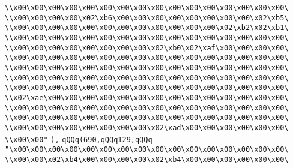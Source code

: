 \verb|\\x00\x00\x00\x00\x00\x00\x00\x00\x00\x00\x00\x00\x00\x00\x00\x00\|\newline
\verb|\\x00\x00\x00\x00\x02\xb6\x00\x00\x00\x00\x00\x00\x00\x00\x02\xb5\|\newline
\verb|\\x00\x00\x00\x00\x00\x00\x00\x00\x00\x00\x00\x00\x02\xb2\x02\xb1\|\newline
\verb|\\x00\x00\x00\x00\x00\x00\x00\x00\x00\x00\x00\x00\x00\x00\x00\x00\|\newline
\verb|\\x00\x00\x00\x00\x00\x00\x00\x00\x02\xb0\x02\xaf\x00\x00\x00\x00\|\newline
\verb|\\x00\x00\x00\x00\x00\x00\x00\x00\x00\x00\x00\x00\x00\x00\x00\x00\|\newline
\verb|\\x00\x00\x00\x00\x00\x00\x00\x00\x00\x00\x00\x00\x00\x00\x00\x00\|\newline
\verb|\\x00\x00\x00\x00\x00\x00\x00\x00\x00\x00\x00\x00\x00\x00\x00\x00\|\newline
\verb|\\x00\x00\x00\x00\x00\x00\x00\x00\x00\x00\x00\x00\x00\x00\x00\x00\|\newline
\verb|\\x02\xae\x00\x00\x00\x00\x00\x00\x00\x00\x00\x00\x00\x00\x00\x00\|\newline
\verb|\\x00\x00\x00\x00\x00\x00\x00\x00\x00\x00\x00\x00\x00\x00\x00\x00\|\newline
\verb|\\x00\x00\x00\x00\x00\x00\x00\x00\x00\x00\x00\x00\x00\x00\x00\x00\|\newline
\verb|\\x00\x00\x00\x00\x00\x00\x00\x00\x02\xad\x00\x00\x00\x00\x00\x00\|\newline
\verb|\\x00\x00"|\newline
\verb|),|\newline
\verb|qQQq(690,qQQq129,qQQq|\newline
\verb|"\x00\x00\x00\x00\x00\x00\x00\x00\x00\x00\x00\x00\x00\x00\x00\x00\|\newline
\verb|\\x00\x00\x02\xb4\x00\x00\x00\x00\x02\xb4\x00\x00\x00\x00\x00\x00\|\newline
